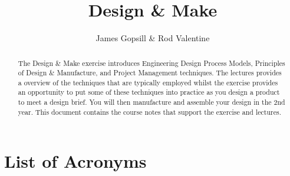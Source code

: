 \documentclass[]{course-notes}
\title{Design \& Make}
\author[Gopsill \& Valentine]{\normalsize James Gopsill \& Rod Valentine}
\begin{document}
\maketitle

\begin{abstract}
    The Design \& Make exercise introduces Engineering Design Process Models, Principles of Design \& Manufacture, and Project Management techniques. 
    The lectures provides a overview of the techniques that are typically employed whilst the exercise provides an opportunity to put some of these techniques into practice as you design a product to meet a design brief. 
    You will then manufacture and assemble your design in the 2nd year. This document contains the course notes that support the exercise and lectures.
\end{abstract}

\clearpage
\setcounter{tocdepth}{2}
\tableofcontents

\clearpage
\listoffigures

\clearpage
\listoftables

\clearpage
\section*{List of Acronyms}
\begin{acronym}[TDMA]
\end{acronym}

















\RaggedRight


\end{document}
